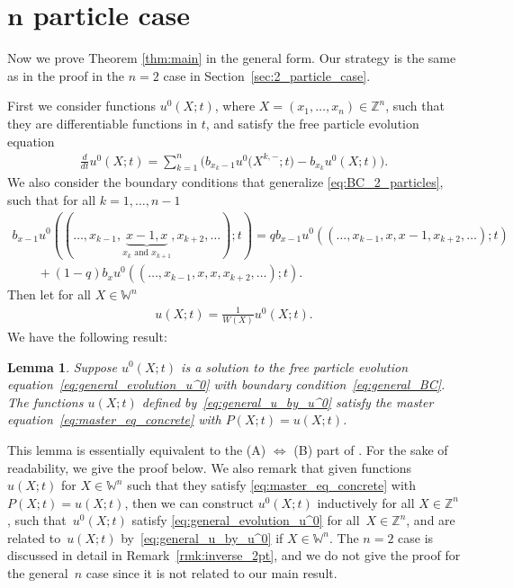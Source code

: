 \documentclass[pdftex]{sigma}
\numberwithin{equation}{section}
\newtheorem{Lemma}[Theorem]{Lemma}
 { \theoremstyle{definition}
\newtheorem{Remark}[Theorem]{Remark} }
\newcommand{\intZ}{\mathbb{Z}}
\newcommand{\Weylchamber}{\mathbb{W}}
\begin{document}
\section[$n$ particle case]{$\boldsymbol{n}$ particle case} \label{sec:n_particle_case}

Now we prove Theorem \ref{thm:main} in the general form. Our strategy is the same as in the proof in the $n = 2$ case in Section~\ref{sec:2_particle_case}.

First we consider functions $u^0(X; t)$, where $X = (x_1, \dotsc, x_n) \in \intZ^n$, such that they are dif\/ferentiable functions in $t$, and satisfy the free particle evolution equation
\begin{gather} \label{eq:general_evolution_u^0}
 \frac{d}{dt} u^0(X; t) = \sum^n_{k = 1} \big( b_{x_k - 1} u^0\big(X^{k, -}; t\big) - b_{x_k} u^0(X; t) \big).
\end{gather}
We also consider the boundary conditions that generalize \eqref{eq:BC_2_particles}, such that for all $k = 1, \dotsc, n - 1$
\begin{gather}
 b_{x - 1} u^0((\dotsc, x_{k - 1}, \underbrace{x - 1, x}_{\text{$x_k$ and $x_{k + 1}$}}, x_{k + 2}, \dotsc); t) = q b_{x - 1} u^0((\dotsc, x_{k - 1}, x, x - 1, x_{k + 2}, \dotsc); t) \nonumber\\
 \qquad{}
+ (1 - q) b_x u^0((\dotsc, x_{k - 1}, x, x, x_{k + 2}, \dotsc); t).\label{eq:general_BC}
\end{gather}
Then let for all $X \in \Weylchamber^n$
\begin{gather} \label{eq:general_u_by_u^0}
 u(X; t) = \frac{1}{W(X)} u^0(X; t).
\end{gather}
We have the following result:
\begin{Lemma} \label{lem:BA_coefficients}
 Suppose $u^0(X; t)$ is a solution to the free particle evolution equation~\eqref{eq:general_evolution_u^0} with boundary condition~\eqref{eq:general_BC}. The functions $u(X; t)$ defined by~\eqref{eq:general_u_by_u^0} satisfy the master equation~\eqref{eq:master_eq_concrete} with $P(X; t) = u(X; t)$.
\end{Lemma}

This lemma is essentially equivalent to the (A) $\Leftrightarrow$ (B) part of \cite[Proposition 2.7]{Borodin-Corwin-Sasamoto14}. For the sake of readability, we give the proof below. We also remark that given functions $u(X; t)$ for $X \in \Weylchamber^n$ such that they satisfy \eqref{eq:master_eq_concrete} with $P(X; t) = u(X; t)$, then we can construct $u^0(X; t)$ inductively for all $X \in \intZ^n$, such that~$u^0(X; t)$ satisfy \eqref{eq:general_evolution_u^0} for all~$X \in \intZ^n$, and are related to~$u(X; t)$ by~\eqref{eq:general_u_by_u^0} if $X \in \Weylchamber^n$. The $n = 2$ case is discussed in detail in Remark~\ref{rmk:inverse_2pt}, and we do not give the proof for the general~$n$ case since it is not related to our main result.
\end{document}
